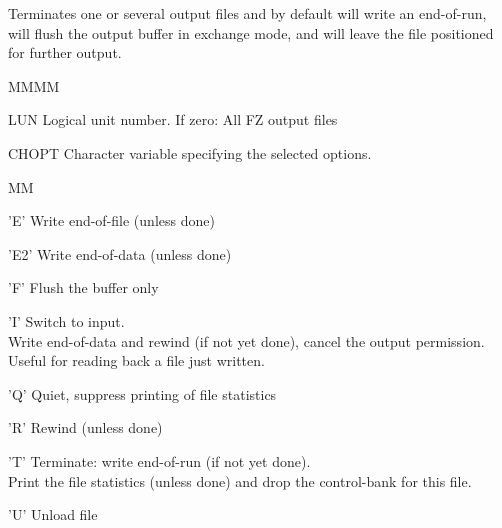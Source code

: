 \par Terminates one or several output files and by default
will write an end-of-run, will flush the output buffer in
exchange mode, and will leave the file positioned for further output.
\Idesc
\begin{DL}{MMMM}
\item[LUN]Logical unit number.
If zero: All FZ output files
\item[CHOPT]Character variable specifying the selected options.
\begin{DL}{MM}
\item['E']Write end-of-file (unless done)
\item['E2']Write end-of-data (unless done)
\item['F']Flush the buffer only
\item['I']Switch to input.\\
Write end-of-data and rewind (if not yet done),
cancel the output permission.\\
Useful for reading back a file just written.
\item['Q']Quiet, suppress printing of file statistics
\item['R']Rewind (unless done)
\item['T']Terminate: write end-of-run (if not yet done).\\
Print the file statistics (unless done) and
drop the control-bank for this file.
\item['U']Unload file
\end{DL}
\end{DL}
